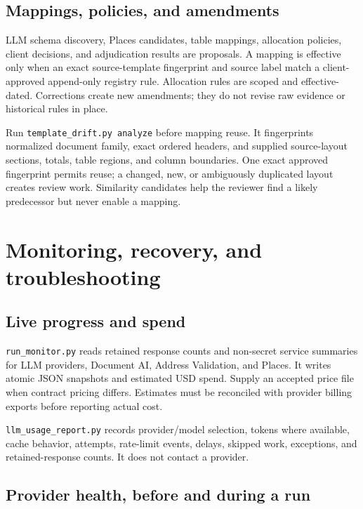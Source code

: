 \documentclass[
]{article}
\begin{document}
\subsection{Mappings, policies, and
amendments}\label{mappings-policies-and-amendments}

LLM schema discovery, Places candidates, table mappings, allocation
policies, client decisions, and adjudication results are proposals. A
mapping is effective only when an exact source-template fingerprint and
source label match a client-approved append-only registry rule.
Allocation rules are scoped and effective-dated. Corrections create new
amendments; they do not revise raw evidence or historical rules in
place.

Run \texttt{template\_\allowbreak{}drift.py analyze} before mapping
reuse. It fingerprints normalized document family, exact ordered
headers, and supplied source-layout sections, totals, table regions, and
column boundaries. One exact approved fingerprint permits reuse; a
changed, new, or ambiguously duplicated layout creates review work.
Similarity candidates help the reviewer find a likely predecessor but
never enable a mapping.

\section{Monitoring, recovery, and
troubleshooting}\label{monitoring-recovery-and-troubleshooting}

\subsection{Live progress and spend}\label{live-progress-and-spend}

\texttt{run\_\allowbreak{}monitor.py} reads retained response counts and
non-secret service summaries for LLM providers, Document AI, Address
Validation, and Places. It writes atomic JSON snapshots and estimated
USD spend. Supply an accepted price file when contract pricing differs.
Estimates must be reconciled with provider billing exports before
reporting actual cost.

\texttt{llm\_\allowbreak{}usage\_\allowbreak{}report.py} records
provider/model selection, tokens where available, cache behavior,
attempts, rate-limit events, delays, skipped work, exceptions, and
retained-response counts. It does not contact a provider.

\subsection{Provider health, before and during a
run}\label{provider-health-before-and-during-a-run}
\end{document}
